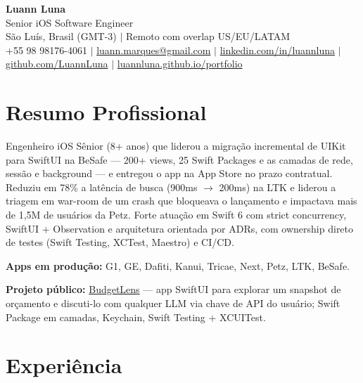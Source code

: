 \documentclass[11pt,letterpaper]{article}
\begin{document}
\begin{center}
    {\LARGE \textbf{Luann Luna}} \\
    \vspace{0.4em}
    Senior iOS Software Engineer \\
    \vspace{0.2em}
    São Luís, Brasil (GMT-3) $|$ Remoto com overlap US/EU/LATAM \\
    \vspace{0.3em}
    +55 98 98176-4061 $|$
    \href{mailto:luann.marques@gmail.com}{luann.marques@gmail.com} $|$
    \href{https://linkedin.com/in/luannluna}{linkedin.com/in/luannluna} $|$
    \href{https://github.com/LuannLuna}{github.com/LuannLuna} $|$
    \href{https://luannluna.github.io/portfolio/}{luannluna.github.io/portfolio}
\end{center}

\vspace{0.4em}

\section*{Resumo Profissional}
Engenheiro iOS Sênior (8+ anos) que liderou a migração incremental de UIKit para SwiftUI na BeSafe --- 200+ views, 25 Swift Packages e as camadas de rede, sessão e background --- e entregou o app na App Store no prazo contratual. Reduziu em 78\% a latência de busca (900ms $\rightarrow$ 200ms) na LTK e liderou a triagem em war-room de um crash que bloqueava o lançamento e impactava mais de 1,5M de usuários da Petz. Forte atuação em Swift 6 com strict concurrency, SwiftUI + Observation e arquitetura orientada por ADRs, com ownership direto de testes (Swift Testing, XCTest, Maestro) e CI/CD.

\vspace{0.3em}
\noindent\textbf{Apps em produção:} G1, GE, Dafiti, Kanui, Tricae, Next, Petz, LTK, BeSafe.

\vspace{0.3em}
\noindent\textbf{Projeto público:} \href{https://github.com/LuannLuna/BudgetLens}{BudgetLens} --- app SwiftUI para explorar um snapshot de orçamento e discuti-lo com qualquer LLM via chave de API do usuário; Swift Package em camadas, Keychain, Swift Testing + XCUITest.

\section*{Experiência}
\end{document}
